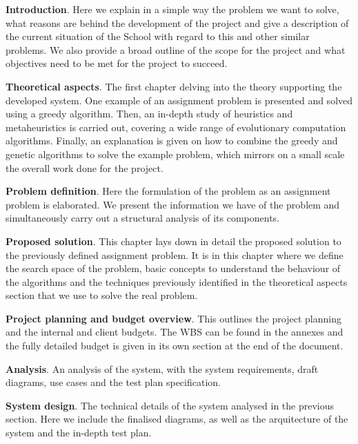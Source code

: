 \begin{description}

    \item \textbf{Introduction}. Here we explain in a simple way the problem we want to solve, what reasons are behind the development of the project and give a description of the current situation of the School with regard to this and other similar problems. We also provide a broad outline of the scope for the project and what objectives need to be met for the project to succeed.

    \item \textbf{Theoretical aspects}. The first chapter delving into the theory supporting the developed system. One example of an assignment problem is presented and solved using a greedy algorithm. Then, an in-depth study of heuristics and metaheuristics is carried out, covering a wide range of evolutionary computation algorithms. Finally, an explanation is given on how to combine the greedy and genetic algorithms to solve the example problem, which mirrors on a small scale the overall work done for the project.

    \item \textbf{Problem definition}. Here the formulation of the problem as an assignment problem is elaborated. We present the information we have of the problem and simultaneously carry out a structural analysis of its components. 

    \item \textbf{Proposed solution}. This chapter lays down in detail the proposed solution to the previously defined assignment problem. It is in this chapter where we define the search space of the problem, basic concepts to understand the behaviour of the algorithms and the techniques previously identified in the theoretical aspects section that we use to solve the real problem. 

    \item \textbf{Project planning and budget overview}. This outlines the project planning and the internal and client budgets. The WBS can be found in the annexes and the fully detailed budget is given in its own section at the end of the document. 

    \item \textbf{Analysis}. An analysis of the system, with the system requirements, draft diagrams, use cases and the test plan specification. 

    \item \textbf{System design}. The technical details of the system analysed in the previous section. Here we include the finalised diagrams, as well as the arquitecture of the system and the in-depth test plan.


\end{description}
